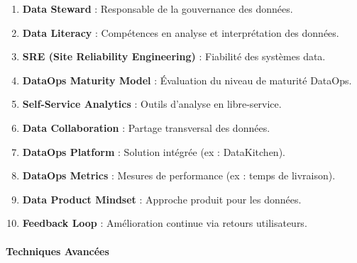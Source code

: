 \documentclass[
  letterpaper,
  DIV=11,
  numbers=noendperiod]{scrartcl}
\makeatletter
\let\oldparagraph\paragraph
\renewcommand{\paragraph}{
    \@ifstar
      \xxxParagraphStar
      \xxxParagraphNoStar
  }
\newcommand{\xxxParagraphStar}[1]{\oldparagraph*{#1}\mbox{}}
\newcommand{\xxxParagraphNoStar}[1]{\oldparagraph{#1}\mbox{}}
\providecommand{\tightlist}{%
  \setlength{\itemsep}{0pt}\setlength{\parskip}{0pt}}\usepackage{longtable,booktabs,array}
\makeatother
\begin{document}
\begin{enumerate}
\def\labelenumi{\arabic{enumi}.}
\setcounter{enumi}{40}
\tightlist
\item
  \textbf{Data Steward} : Responsable de la gouvernance des données.\\
\item
  \textbf{Data Literacy} : Compétences en analyse et interprétation des
  données.\\
\item
  \textbf{SRE (Site Reliability Engineering)} : Fiabilité des systèmes
  data.\\
\item
  \textbf{DataOps Maturity Model} : Évaluation du niveau de maturité
  DataOps.\\
\item
  \textbf{Self-Service Analytics} : Outils d'analyse en libre-service.\\
\item
  \textbf{Data Collaboration} : Partage transversal des données.\\
\item
  \textbf{DataOps Platform} : Solution intégrée (ex : DataKitchen).\\
\item
  \textbf{DataOps Metrics} : Mesures de performance (ex : temps de
  livraison).\\
\item
  \textbf{Data Product Mindset} : Approche produit pour les données.\\
\item
  \textbf{Feedback Loop} : Amélioration continue via retours
  utilisateurs.
\end{enumerate}

\paragraph{\texorpdfstring{\textbf{Techniques
Avancées}}{Techniques Avancées}}\label{techniques-avancuxe9es-1}
\end{document}

